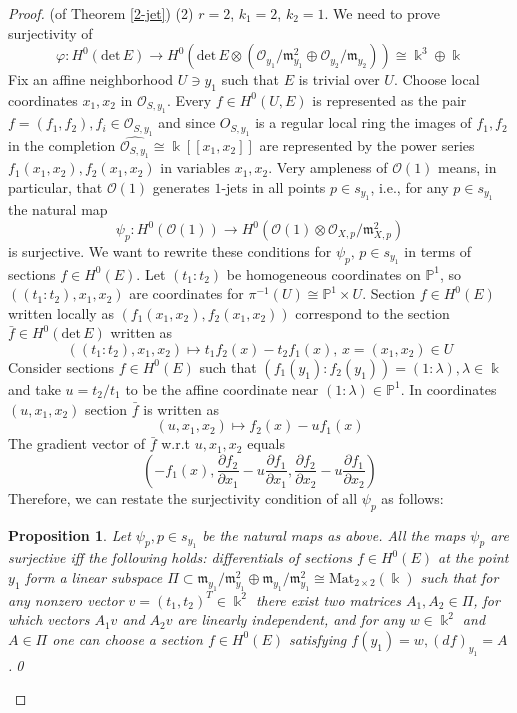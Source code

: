 \documentclass[a4paper]{amsart}
\theoremstyle{plain}
\newtheorem{prop}[theorem]{Proposition}
\theoremstyle{definition}
\begin{document}
\begin{proof}{(of Theorem \ref{2-jet})}
    (2) $r=2$, $k_1=2$, $k_2=1$. We need to prove surjectivity of
    \[
    \varphi \colon H^0(\mathrm{det}\, E) \to H^0(\mathrm{det} \,E \otimes (\mathcal O_{y_1}/\mathfrak m_{y_1}^2\oplus \mathcal O_{y_2} / \mathfrak m_{y_2})) \cong \Bbbk^3\oplus \Bbbk
    \]
    Fix an affine neighborhood $U \ni y_1$ such that $E$ is trivial over $U$. Choose local coordinates $x_1, x_2$ in $\mathcal O_{S, y_1}$.
    Every $f\in H^0(U, E)$ is represented as the pair $f = (f_1, f_2), f_i \in \mathcal O_{S,y_1}$ and since $O_{S,y_1}$ is a regular local ring the images of $f_1, f_2$ in the completion $\widehat{\mathcal O_{S, y_1}} \cong \Bbbk[[x_1, x_2]]$ are represented by the power series $f_1(x_1, x_2), f_2(x_1, x_2)$ in variables $x_1, x_2$.
    Very ampleness of $\mathcal O(1)$ means, in particular, that $\mathcal O(1)$ generates $1$-jets in all points $p \in s_{y_1}$, i.e., for any $p \in s_{y_1}$ the natural map
    \[
    \psi_p \colon H^0(\mathcal O(1)) \to H^0(\mathcal O(1) \otimes \mathcal O_{X, p}/ \mathfrak m_{X, p}^2)
    \]
    is surjective.
    We want to rewrite these conditions for $\psi_p,\, p \in s_{y_1}$ in terms of sections $f\in H^0(E)$.
    Let $(t_1 \colon t_2)$ be homogeneous coordinates on $\mathbb P^1$, so $((t_1 \colon t_2), x_1, x_2)$ are coordinates for $\pi^{-1}(U) \cong \mathbb P^1 \times U$.
    Section $f\in H^0(E)$ written locally as $(f_1(x_1, x_2), f_2(x_1, x_2))$ correspond to the section $\bar f\in H^0(\mathrm{det}\, E)$ written as
    \[
    ((t_1:t_2), x_1, x_2) \mapsto t_1 f_2(x) - t_2 f_1(x),\, x = (x_1, x_2) \in U
    \]
    Consider sections $f \in H^0(E)$ such that $(f_1(y_1)\colon f_2(y_1)) = (1:\lambda), \lambda \in \Bbbk$ and take $u = t_2/t_1$ to be the affine coordinate near $(1:\lambda) \in \mathbb P^1$.
    In coordinates $(u, x_1, x_2)$ section $\bar f$ is written as
    \[
    (u, x_1, x_2) \mapsto f_2(x)-uf_1(x)
    \]
    The gradient vector of $\bar f$ w.r.t $u, x_1, x_2$ equals
    \[
    \left(-f_1(x), \frac{\partial f_2}{\partial x_1} - u\frac{\partial f_1}{\partial x_1}, \frac{\partial f_2}{\partial x_2} - u\frac{\partial f_1}{\partial x_2}\right)
    \]
    Therefore, we can restate the surjectivity condition of all $\psi_p$ as follows:
    \begin{prop}
        \label{matrices}
        Let $\psi_p, p \in s_{y_1}$ be the natural maps as above.
        All the maps $\psi_p$ are surjective iff the following holds: differentials of sections $f\in H^0(E)$ at the point $y_1$ form a linear subspace $\Pi\subset \mathfrak m_{y_1}/\mathfrak m_{y_1}^2 \oplus \mathfrak m_{y_1}/\mathfrak m_{y_1}^2 \cong \mathrm{Mat}_{2 \times 2}(\Bbbk)$
        such that for any nonzero vector $v = (t_1, t_2)^T \in \Bbbk^2$ there exist two matrices $A_1, A_2 \in \Pi$, for which vectors $A_1 v$ and $A_2 v$ are linearly independent,
        and for any $w \in \Bbbk^2$ and $A\in \Pi$ one can choose a section $f \in H^0(E)$ satisfying $f(y_1) = w, (df)_{y_1} = A$.\qed
    \end{prop}
    

\end{proof}
\end{document}

